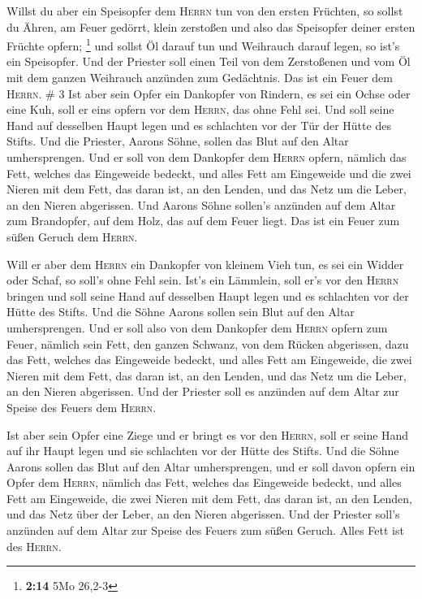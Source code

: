  Willst du aber ein Speisopfer dem \textsc{Herrn} tun von
den ersten Früchten, so sollst du Ähren, am Feuer gedörrt, klein
zerstoßen und also das Speisopfer deiner ersten Früchte opfern;
\footnote{\textbf{2:14} 5Mo 26,2-3}  und sollst Öl darauf
tun und Weihrauch darauf legen, so ist's ein Speisopfer. 
Und der Priester soll einen Teil von dem Zerstoßenen und vom Öl mit dem
ganzen Weihrauch anzünden zum Gedächtnis. Das ist ein Feuer dem
\textsc{Herrn}. \# 3  Ist aber sein Opfer ein Dankopfer
von Rindern, es sei ein Ochse oder eine Kuh, soll er eins opfern vor dem
\textsc{Herrn}, das ohne Fehl sei.  Und soll seine Hand
auf desselben Haupt legen und es schlachten vor der Tür der Hütte des
Stifts. Und die Priester, Aarons Söhne, sollen das Blut auf den Altar
umhersprengen.  Und er soll von dem Dankopfer dem
\textsc{Herrn} opfern, nämlich das Fett, welches das Eingeweide bedeckt,
und alles Fett am Eingeweide  und die zwei Nieren mit dem
Fett, das daran ist, an den Lenden, und das Netz um die Leber, an den
Nieren abgerissen.  Und Aarons Söhne sollen's anzünden auf
dem Altar zum Brandopfer, auf dem Holz, das auf dem Feuer liegt. Das ist
ein Feuer zum süßen Geruch dem \textsc{Herrn}.

 Will er aber dem \textsc{Herrn} ein Dankopfer von kleinem
Vieh tun, es sei ein Widder oder Schaf, so soll's ohne Fehl sein.
 Ist's ein Lämmlein, soll er's vor den \textsc{Herrn}
bringen  und soll seine Hand auf desselben Haupt legen und
es schlachten vor der Hütte des Stifts. Und die Söhne Aarons sollen sein
Blut auf den Altar umhersprengen.  Und er soll also von
dem Dankopfer dem \textsc{Herrn} opfern zum Feuer, nämlich sein Fett,
den ganzen Schwanz, von dem Rücken abgerissen, dazu das Fett, welches
das Eingeweide bedeckt, und alles Fett am Eingeweide, 
die zwei Nieren mit dem Fett, das daran ist, an den Lenden, und das Netz
um die Leber, an den Nieren abgerissen.  Und der Priester
soll es anzünden auf dem Altar zur Speise des Feuers dem \textsc{Herrn}.

 Ist aber sein Opfer eine Ziege und er bringt es vor den
\textsc{Herrn},  soll er seine Hand auf ihr Haupt legen
und sie schlachten vor der Hütte des Stifts. Und die Söhne Aarons sollen
das Blut auf den Altar umhersprengen,  und er soll davon
opfern ein Opfer dem \textsc{Herrn}, nämlich das Fett, welches das
Eingeweide bedeckt, und alles Fett am Eingeweide,  die
zwei Nieren mit dem Fett, das daran ist, an den Lenden, und das Netz
über der Leber, an den Nieren abgerissen.  Und der
Priester soll's anzünden auf dem Altar zur Speise des Feuers zum süßen
Geruch. Alles Fett ist des \textsc{Herrn}.

